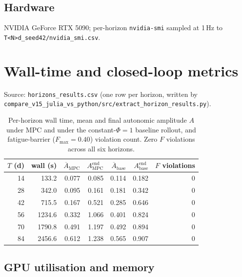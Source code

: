 \documentclass[11pt,a4paper]{article}
\begin{document}
\subsection{Hardware}

NVIDIA GeForce RTX 5090; per-horizon \texttt{nvidia-smi} sampled at
1\,Hz to \texttt{T<N>d\_seed42/nvidia\_smi.csv}.


\section{Wall-time and closed-loop metrics}
\label{sec:wall}

Source: \texttt{horizons\_results.csv} (one row per horizon, written
by \texttt{compare\_v15\_julia\_vs\_python/src/extract\_horizon\_results.py}).

\begin{table}[ht]
\centering
\small
\begin{tabular}{rrrrrrr}
\toprule
$T$ (d) & wall (s) & $\overline{A}_{\mathrm{MPC}}$ & $A^{\mathrm{end}}_{\mathrm{MPC}}$ & $\overline{A}_{\mathrm{base}}$ & $A^{\mathrm{end}}_{\mathrm{base}}$ & $F$ violations \\
\midrule
14 & 133.2  & 0.077 & 0.085 & 0.114 & 0.182 & 0 \\
28 & 342.0  & 0.095 & 0.161 & 0.181 & 0.342 & 0 \\
42 & 715.5  & 0.167 & 0.521 & 0.285 & 0.646 & 0 \\
56 & 1234.6 & 0.332 & 1.066 & 0.401 & 0.824 & 0 \\
70 & 1790.8 & 0.491 & 1.197 & 0.492 & 0.894 & 0 \\
84 & 2456.6 & 0.612 & 1.238 & 0.565 & 0.907 & 0 \\
\bottomrule
\end{tabular}
\caption{Per-horizon wall time, mean and final autonomic amplitude
$A$ under MPC and under the constant-$\Phi=1$ baseline rollout, and
fatigue-barrier ($F_{\max}=0.40$) violation count. Zero $F$
violations across all six horizons.}
\label{tab:wall}
\end{table}

\subsection{GPU utilisation and memory}
\end{document}
